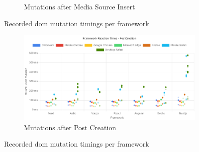 \documentclass[a4paper, 12pt]{article}
\begin{document}
\begin{figure}[ht!]
\begin{subfigure}{0.8\linewidth}
\begin{center}
    \end{center}
    \caption{Mutations after Media Source Insert}\label{subfig:PW:mediaSourceInsert}
  \end{subfigure}
  \caption{Recorded \acrshort{dom} mutation timings per framework}
\end{figure}
\begin{figure}[ht!]\ContinuedFloat
  \centering
  \begin{subfigure}{0.8\linewidth}
    \begin{center}
      \includegraphics[width=\linewidth, keepaspectratio]{img/playwright-results/userActions_byUserAction/postCreation.png}
    \end{center}
    \caption{Mutations after Post Creation}\label{subfig:PW:postCreation}
  \end{subfigure}
  \caption{Recorded \acrshort{dom} mutation timings per framework}
  \label{fig:playwrightResults:frameworks}
\end{figure}
\end{document}
